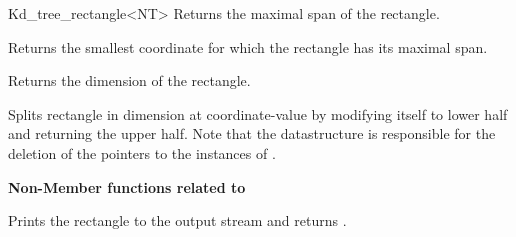 \begin{ccRefClass}{Kd_tree_rectangle<NT>}
{Returns the maximal span of the rectangle.}

{Returns the smallest coordinate for which the rectangle has its maximal span.}

{Returns the dimension of the rectangle.}

{Splits rectangle in dimension  at coordinate-value  
 by modifying itself to lower half and returning the upper half.
Note that the  datastructure is responsible for the
deletion of the pointers to the instances of .} 

{\bf Non-Member functions related to }

\ccGlueBegin
{} 
{Prints the rectangle  to the output stream  and returns .}
\ccGlueEnd




\end{ccRefClass}


